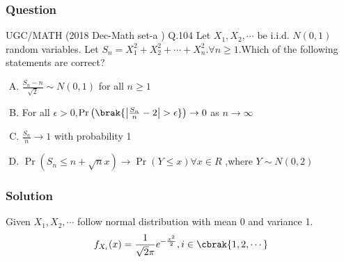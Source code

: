 \documentclass{beamer}
\providecommand{\pr}[1]{\ensuremath{\Pr\left(#1\right)}}
\begin{document}
\begin{frame}
\frametitle{Question}
\begin{block}{ UGC/MATH (2018 Dec-Math set-a ) Q.104}
Let $X_1,X_2, \cdots$ be i.i.d. $N(0,1)$ random variables. Let $S_{n}=X_{1}^2+X_{2}^2+\cdots+X_{n}^2.\forall n\geq 1. $Which of the following statements are correct?
\begin{enumerate}[(A)]
\setlength\itemsep{1em}
\item $\frac{S_{n}-n}{\sqrt{2}}\sim N(0,1)$ for all $n\geq 1$
\item For all $\epsilon > 0$,$\pr{\brak{\left|{\frac{S_n}{n}-2}\right|>\epsilon}}\to 0$ as $n \to \infty$
\item $\frac{S_{n}}{n} \to 1$ with probability 1
\item $\pr{S_n \leq n+ \sqrt{n}x} \rightarrow \pr{Y \leq x} \forall x \in R$ ,where $Y \sim N(0,2)$
\end{enumerate}
\end{block}
\end{frame}

\begin{frame}
\frametitle{Solution}
Given $X_1,X_2, \cdots$ follow normal distribution with mean 0 and variance 1.
\begin{align}
    f_{X_i}(x)=\frac{1}{\sqrt{2}\pi}e^{-\frac{x^2}{2}} ,i \in \cbrak{1,2,\cdots}
\end{align}

 \end{frame}
\end{document}

